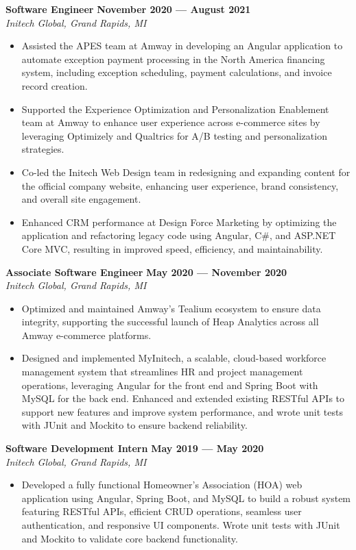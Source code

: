 \documentclass{article}
\begin{document}
\textbf{Software Engineer} \hfill \textbf{November 2020 --- August 2021}\\
\textit{Initech Global, Grand Rapids, MI}
\begin{itemize}
  \item Assisted the APES team at Amway in developing an Angular application to automate exception payment processing in the North America financing system, including exception scheduling, payment calculations, and invoice record creation.
  \ifdefined{}
    \item Supported the Experience Optimization and Personalization Enablement team at Amway to enhance user experience across e-commerce sites by leveraging Optimizely and Qualtrics for A/B testing and personalization strategies.
  \fi
  \item Co-led the Initech Web Design team in redesigning and expanding content for the official company website, enhancing user experience, brand consistency, and overall site engagement.
  \item Enhanced CRM performance at Design Force Marketing by optimizing the application and refactoring legacy code using Angular, C\#, and ASP.NET Core MVC, resulting in improved speed, efficiency, and maintainability.
\end{itemize}
\medskip

\textbf{Associate Software Engineer} \hfill \textbf{May 2020 --- November 2020}\\
\textit{Initech Global, Grand Rapids, MI}
\begin{itemize}
  \ifdefined{}
    \item Optimized and maintained Amway’s Tealium ecosystem to ensure data integrity, supporting the successful launch of Heap Analytics across all Amway e-commerce platforms.
  \fi
  \item Designed and implemented MyInitech, a scalable, cloud-based workforce management system that streamlines HR and project management operations, leveraging Angular for the front end and Spring Boot with MySQL for the back end. Enhanced and extended existing RESTful APIs to support new features and improve system performance, and wrote unit tests with JUnit and Mockito to ensure backend reliability.
\end{itemize}
\medskip

\textbf{Software Development Intern} \hfill \textbf{May 2019 --- May 2020}\\
\textit{Initech Global, Grand Rapids, MI}
\begin{itemize}
  \item Developed a fully functional Homeowner's Association (HOA) web application using Angular, Spring Boot, and MySQL to build a robust system featuring RESTful APIs, efficient CRUD operations, seamless user authentication, and responsive UI components. Wrote unit tests with JUnit and Mockito to validate core backend functionality.
\end{itemize}
\end{document}
